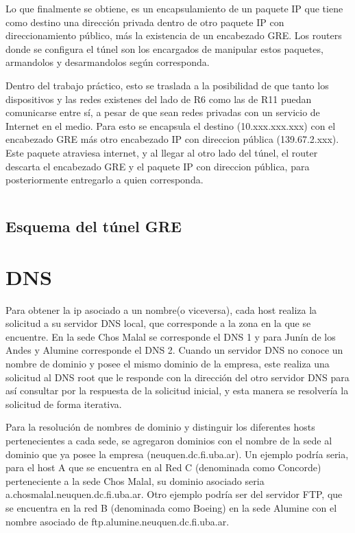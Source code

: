 \documentclass[12pt,a4paper,spanish]{article}
\begin{document}
Lo que finalmente se obtiene, es un encapsulamiento de un paquete IP que tiene como destino una dirección privada dentro de otro paquete IP con direccionamiento público, más la existencia de un encabezado GRE. Los routers donde se configura el túnel son los encargados de manipular estos paquetes, armandolos y desarmandolos según corresponda.

Dentro del trabajo práctico, esto se traslada a la posibilidad de que tanto los dispositivos y las redes existenes del lado de R6 como las de R11 puedan comunicarse entre sí, a pesar de que sean redes privadas con un servicio de Internet en el medio. Para esto se encapsula el destino (10.xxx.xxx.xxx) con el encabezado GRE más otro encabezado IP con direccion pública (139.67.2.xxx). Este paquete atraviesa internet, y al llegar al otro lado del túnel, el router descarta el encabezado GRE y el paquete IP con direccion pública, para posteriormente entregarlo a quien corresponda.

{\small
\begin{verbatim}

\end{verbatim}
}

\subsection{Esquema del túnel GRE}

\newpage


\newpage
\section{DNS}
Para obtener la ip asociado a un nombre(o viceversa), cada host realiza la solicitud a su servidor DNS local, que corresponde a la zona en la que se encuentre. En la sede Chos Malal se corresponde el DNS 1 y para Junín de los Andes y Alumine corresponde el DNS 2. Cuando un servidor DNS no conoce un nombre de dominio y posee el mismo dominio de la empresa, este realiza una solicitud al DNS root que le responde con la dirección del otro servidor DNS para así consultar por la respuesta de la solicitud inicial, y esta manera se resolvería la solicitud de forma iterativa.

Para la resolución de nombres de dominio y distinguir los diferentes hosts pertenecientes a cada sede, se agregaron dominios con el nombre de la sede al dominio que ya posee la empresa (neuquen.dc.fi.uba.ar). Un ejemplo podría seria, para el host A que se encuentra en al Red C (denominada como Concorde) perteneciente a la sede Chos Malal, su dominio asociado seria a.chosmalal.neuquen.dc.fi.uba.ar. Otro ejemplo podría ser del servidor FTP, que se encuentra en la red B (denominada como Boeing) en la sede Alumine con el nombre asociado de ftp.alumine.neuquen.dc.fi.uba.ar.
\end{document}
